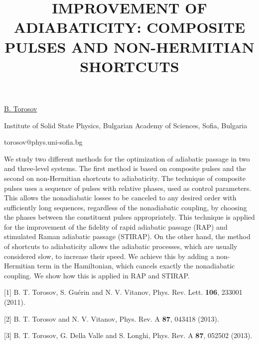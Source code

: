 \title{IMPROVEMENT OF ADIABATICITY: COMPOSITE PULSES AND NON-HERMITIAN SHORTCUTS}

\underline{B. Torosov} 

{\normalsize{\vspace{-4mm}
Institute of Solid State Physics, Bulgarian Academy of Sciences, Sofia, Bulgaria

\email torosov@phys.uni-sofia.bg}}

We study two different methods for the optimization of adiabatic passage in two and three-level systems. The first method is based on composite pulses and the second on non-Hermitian shortcuts to adiabaticity. The technique of composite pulses uses a sequence of pulses with relative phases, used as control parameters. This allows the nonadiabatic losses to be canceled to any desired order with sufficiently long sequences, regardless of the nonadiabatic coupling, by choosing the phases between the constituent pulses appropriately. This technique is applied for the improvement of the fidelity of rapid adiabatic passage (RAP) and stimulated Raman adiabatic passage (STIRAP). On the other hand, the method of shortcuts to adiabaticity allows the adiabatic processes, which are usually considered slow, to increase their speed. We achieve this by adding a non-Hermitian term in the Hamiltonian, which cancels exactly the nonadiabatic coupling. We show how this is applied in RAP and STIRAP.

{\normalsize
[1] B. T. Torosov, S. Gu\'{e}rin and N. V. Vitanov, Phys. Rev. Lett. \textbf{106}, 233001 (2011).
\vsp

[2] B. T. Torosov and N. V. Vitanov, Phys. Rev. A \textbf{87}, 043418 (2013).
\vsp

[3] B. T. Torosov, G. Della Valle and S. Longhi, Phys. Rev. A \textbf{87}, 052502 (2013).
}

\vspace{\baselineskip}
